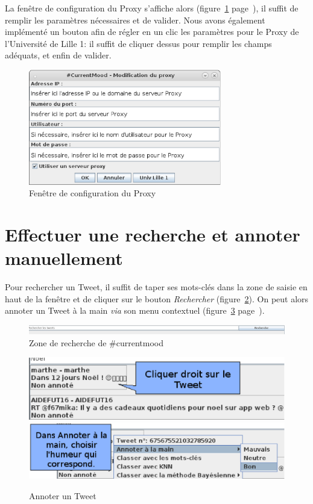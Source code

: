 \documentclass[12pt,a4paper]{report}
\newcommand{\CMName}{\#currentmood}
\begin{document}
La fenêtre de configuration du Proxy s'affiche alors
(figure~\ref{capture_fenproxy} page~\pageref{capture_fenproxy}), il suffit de
remplir les paramètres nécessaires et de valider. Nous avons également
implémenté un bouton afin de régler en un clic les paramètres pour le Proxy de
l'Université de Lille 1: il suffit de cliquer dessus pour remplir les champs
adéquats, et enfin de valider.

\begin{figure}
	\centering
	\includegraphics[width=0.75\textwidth]{img/capture_fenproxy.eps}
	\caption{Fenêtre de configuration du Proxy}
\label{capture_fenproxy}
\end{figure}

\newpage
\section{Effectuer une recherche  et annoter manuellement}
Pour rechercher un Tweet, il suffit de taper ses mots-clés dans la zone de
saisie en haut de la fenêtre et de cliquer sur le bouton \textit{Rechercher}
(figure~\ref{capture_rechercherTweet}).
On peut alors annoter un Tweet à la main \textit{via} son menu contextuel
(figure~\ref{capture_annoterTweet} page~\pageref{capture_annoterTweet}).

\begin{figure}
	\centering
	\includegraphics[width=\textwidth]{img/chercheruntweet.png}
	\caption{Zone de recherche de \CMName}
\label{capture_rechercherTweet}
\end{figure}


\begin{figure}
	\centering
	\includegraphics[width=\textwidth]{img/capture_annotertweet1.eps}
	\includegraphics[width=\textwidth]{img/capture_annotertweet2.eps}
	\caption{Annoter un Tweet}
\label{capture_annoterTweet}
\end{figure}
\end{document}
